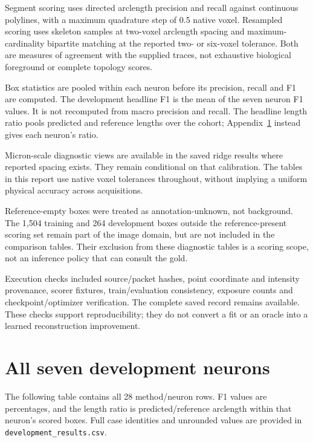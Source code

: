 \documentclass[11pt,a4paper]{article}
\newcommand{\evidence}[1]{~\cite{#1}}
\begin{document}
Segment scoring uses directed arclength precision and recall against continuous polylines, with a maximum quadrature step of 0.5 native voxel. Resampled scoring uses skeleton samples at two-voxel arclength spacing and maximum-cardinality bipartite matching at the reported two- or six-voxel tolerance. Both are measures of agreement with the supplied traces, not exhaustive biological foreground or complete topology scores.

Box statistics are pooled within each neuron before its precision, recall and F1 are computed. The development headline F1 is the mean of the seven neuron F1 values. It is not recomputed from macro precision and recall. The headline length ratio pools predicted and reference lengths over the cohort; Appendix~\ref{app:neurons} instead gives each neuron's ratio.

Micron-scale diagnostic views are available in the saved ridge results where reported spacing exists. They remain conditional on that calibration. The tables in this report use native voxel tolerances throughout, without implying a uniform physical accuracy across acquisitions.

Reference-empty boxes were treated as annotation-unknown, not background. The 1,504 training and 264 development boxes outside the reference-present scoring set remain part of the image domain, but are not included in the comparison tables. Their exclusion from these diagnostic tables is a scoring scope, not an inference policy that can consult the gold.

Execution checks included source/packet hashes, point coordinate and intensity provenance, scorer fixtures, train/evaluation consistency, exposure counts and checkpoint/optimizer verification. The complete saved record remains available. These checks support reproducibility; they do not convert a fit or an oracle into a learned reconstruction improvement.\evidence{cohort,formulation,broad,compact}

\clearpage
\section{All seven development neurons}
\label{app:neurons}
The following table contains all 28 method/neuron rows. F1 values are percentages, and the length ratio is predicted/reference arclength within that neuron's scored boxes. Full case identities and unrounded values are provided in \texttt{development\_results.csv}.\evidence{compact,benchmarkdata}
\end{document}
